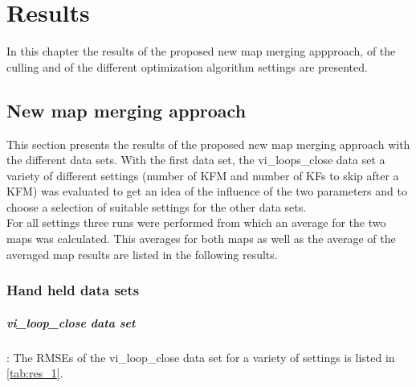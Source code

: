 \chapter{Results}
\label{chap:results}

In this chapter the results of the proposed new map merging appproach, of the culling and of the different optimization algorithm settings are presented.

\section{New map merging approach}
This section presents the results of the proposed new map merging approach with the different data sets. With the first data set, the vi\_loops\_close data set a variety of different settings (number of \ac{KFM} and number of \acp{KF} to skip after a \ac{KFM}) was evaluated to get an idea of the influence of the two parameters and to choose a selection of suitable settings for the other data sets.\\

For all settings three runs were performed from which an average for the two maps was calculated. This averages for both maps as well as the average of the averaged map results are listed in the following results.

\subsection{Hand held data sets}

\paragraph{vi\_loop\_close data set}: The \acp{RMSE} of the vi\_loop\_close data set for a variety of settings is listed in \autoref{tab:res_1}.

